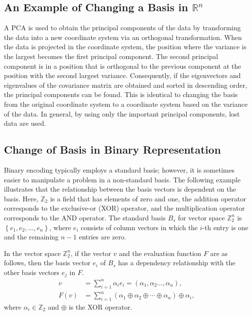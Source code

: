 \subsection{An Example of Changing a Basis in \boldmath$\mathbb{R}^n$}
A PCA is used to obtain the principal components of the data by transforming the data into a new coordinate system via an orthogonal transformation. When the data is projected in the coordinate system, the position where the variance is the largest becomes the first principal component. The second principal component is in a position that is orthogonal to the previous component at the position with the second largest variance. Consequently, if the eigenvectors and eigenvalues of the covariance matrix are obtained and sorted in descending order, the principal components can be found. This is identical to changing the basis from the original coordinate system to a coordinate system based on the variance of the data. In general, by using only the important principal components, lost data are used. 

\subsection{Change of Basis in Binary Representation} \label{sec22:cob}
Binary encoding typically employs a standard basis; however, it is sometimes easier to manipulate a problem in a non-standard basis. The following example illustrates that the relationship between the basis vectors is dependent on the basis. Here, $ \mathbb{Z}_2 $ is a field that has elements of zero and one, the addition operator corresponds to the exclusive-or (XOR) operator, and the multiplication operator corresponds to the AND operator. The standard basis $ B_s $ for vector space $ \mathbb{Z}_2^n $ is $ \left\{e_1,e_2,\ldots,e_n\right\} $, where $ e_i $ consists of column vectors in which the $ i $-th entry is one and the remaining $ n-1 $ entries are zero.

In the vector space $ \mathbb{Z}_2^n $, if the vector $ v $ and the evaluation function $ F $ are as follows, then the basis vector $ e_i $ of $ B_s $ has a dependency relationship with the other basis vectors $ e_j $ in $ F $.
\begin{align*}
v&=\sum_{i=1}^{n}{\alpha_ie_i}=\left(\alpha_1,\alpha_2\ldots,\alpha_n\right), \\
F\left(v\right)&=\sum_{i=1}^{n}{\left(\alpha_1\oplus\alpha_2\oplus\cdots\oplus\alpha_n\right)\oplus\alpha_i},
\end{align*}
where $ \alpha_i\in\mathbb{Z}_2 $ and $ \oplus $ is the XOR operator.

